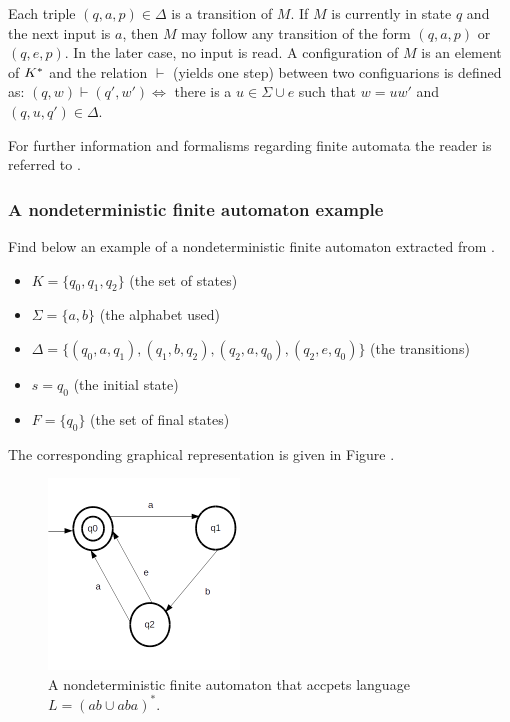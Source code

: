 Each triple $(q,a,p) \in \Delta$ is a transition of $M$. If $M$ is currently in state $q$ and the next input is $a$, then $M$ may follow any transition of the form $(q,a,p)$ or $(q,e,p)$. In the later case, no input is read. A configuration of $M$ is an element of $K\time \Sigma^*$ and the relation $\vdash$ (yields one step) between two configuarions is defined as: $(q,w) \vdash (q',w') \Leftrightarrow$ there is a $u \in \Sigma \cup {e}$ such that $w = uw'$ and $(q,u,q') \in \Delta$.

For further information and formalisms regarding finite automata the reader is referred to \cite{Lewis:98}. 

\subsubsection{A nondeterministic finite automaton example}

Find below an example of a nondeterministic finite automaton extracted from \cite{Lewis:98}.

\begin{itemize}
\item $K = \{q_0, q_1, q_2\}$ (the set of states)

\item $\Sigma = \{a, b\}$ (the alphabet used)

\item $\Delta = \{(q_0,a,q_1),(q_1,b,q_2),(q_2,a,q_0),(q_2,e,q_0)\}$ (the transitions)

\item $s = q_0$ (the initial state)

\item $F = \{q_0\}$ (the set of final states)
\end{itemize}

The corresponding graphical representation is given in Figure \cite{fig:nfa1}.

\begin{figure}[htb]
\centering
\includegraphics[width=2in]{figuras/nfa1}
\caption{\label{fig:nfa1}A nondeterministic finite automaton that accpets language $L = (ab \cup aba)^{*}$.}
\end{figure}



